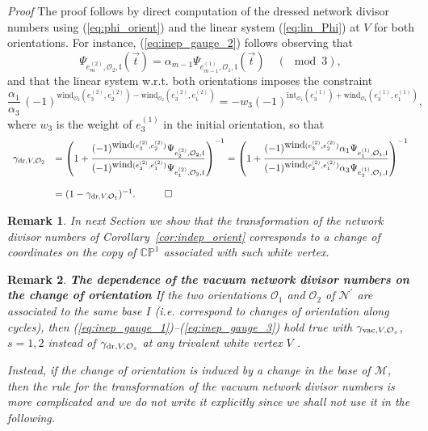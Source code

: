 \documentclass[11pt]{amsart}
\theoremstyle{plain}
\numberwithin{equation}{section}
\newtheorem{remark}{Remark}[subsection]
\begin{document}
{\sl Proof}
The proof follows by direct computation of the dressed network divisor numbers using (\ref{eq:phi_orient}) and the linear system (\ref{eq:lin_Phi}) at $V$ for both orientations. For instance, (\ref{eq:inep_gauge_2}) follows observing that
\[
\Psi_{e_m^{(2)}, \mathcal O_2, \mathfrak l} (\vec t) = \alpha_{m-1} \Psi_{e_{m-1}^{(1)}, \mathcal O_1, \mathfrak l} (\vec t) \quad (\!\!\!\!\!\!\mod 3),
\]
and that the linear system w.r.t. both orientations imposes the constraint
\[
\displaystyle
\frac{\alpha_1}{\alpha_3} \, (-1)^{\mbox{wind}_{\mathcal O_2} (e^{(2)}_3,e^{(2)}_2)-\mbox{wind}_{\mathcal O_2} (e^{(2)}_3,e^{(2)}_1)} = -w_3(-1)^{\mbox{int}_{\mathcal O_1} (e^{(1)}_3)+\mbox{wind}_{\mathcal O_1} (e^{(1)}_3,e^{(1)}_1)},
\] 
where $w_3$ is the weight of $e^{(1)}_3$ in the initial orientation,
so that
\[
\begin{array}{ll}
\gamma_{\textup{\scriptsize dr},V,\mathcal O_2} &= \displaystyle\left(1+\frac{(-1)^{\mbox{wind}(e_3^{(2)}, e_2^{(2)})} \Psi_{e_2^{(2)},\mathcal O_2,\mathfrak l}}{(-1)^{\mbox{wind}(e_3^{(2)}, e_1^{(2)})} \Psi_{e_1^{(2)},\mathcal O_2,\mathfrak l} }\right)^{-1} =\left(1+\frac{(-1)^{\mbox{wind}(e_3^{(2)}, e_2^{(2)})} \alpha_1 \Psi_{e_1^{(1)},\mathcal O_1,\mathfrak l} }{(-1)^{\mbox{wind}(e_3^{(2)}, e_1^{(2)})} \alpha_3 \Psi_{e_3^{(1)},\mathcal O_1,\mathfrak l} }\right)^{-1}\\
&\\
& =(1-\gamma_{\textup{\scriptsize dr},V,\mathcal O_1})^{-1}.\quad\quad\quad \square
\end{array}
\]
\begin{remark}
In next Section we show that the transformation of the network divisor numbers of Corollary~\ref{cor:indep_orient} corresponds to a change of coordinates on the copy of 
$\mathbb{CP}^1$ associated with such white vertex. 
\end{remark}

\begin{remark}\label{rem:vac_div_orient}\textbf{The dependence of the vacuum network divisor numbers on the change of orientation}
If the two orientations ${\mathcal O}_1$ and ${\mathcal O}_2$ of ${\mathcal N}^{\prime}$ are associated to the same base $I$ ({\sl i.e.} correspond to changes of orientation along cycles), then (\ref{eq:inep_gauge_1})--(\ref{eq:inep_gauge_3}) hold true with $\gamma_{\textup{\scriptsize vac},V,\mathcal O_s}$, $s=1,2$ instead of $\gamma_{\textup{\scriptsize dr},V,\mathcal O_s}$ at any trivalent white vertex $V$ . 

Instead, if the change of orientation is induced by a change in the base of ${\mathcal M}$, then the rule for the transformation of the vacuum network divisor numbers is more complicated and we do not write it explicitly since we shall not use it in the following.  
\end{remark}
\end{document}
